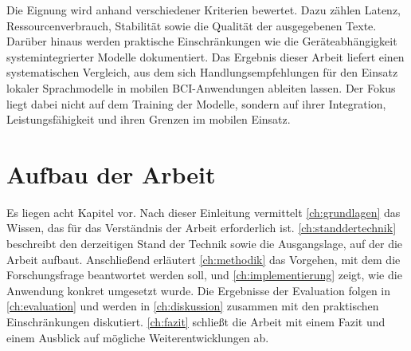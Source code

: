 \noindent Die Eignung wird anhand verschiedener Kriterien bewertet. Dazu zählen Latenz, Ressourcenverbrauch, Stabilität sowie die Qualität der ausgegebenen Texte. Darüber hinaus werden praktische Einschränkungen wie die Geräteabhängigkeit systemintegrierter Modelle dokumentiert. Das Ergebnis dieser Arbeit liefert einen systematischen Vergleich, aus dem sich Handlungsempfehlungen für den Einsatz lokaler Sprachmodelle in mobilen \ac{BCI}-Anwendungen ableiten lassen.
Der Fokus liegt dabei nicht auf dem Training der Modelle, sondern auf ihrer Integration, Leistungsfähigkeit und ihren Grenzen im mobilen Einsatz.

\section{Aufbau der Arbeit}
\label{sec:aufbau}
Es liegen acht Kapitel vor. Nach dieser Einleitung vermittelt \autoref{ch:grundlagen} das Wissen, das für das Verständnis der Arbeit erforderlich ist. \autoref{ch:standdertechnik} beschreibt den derzeitigen Stand der Technik sowie die Ausgangslage, auf der die Arbeit aufbaut. Anschließend erläutert \autoref{ch:methodik} das Vorgehen, mit dem die Forschungsfrage beantwortet werden soll, und \autoref{ch:implementierung} zeigt, wie die Anwendung konkret umgesetzt wurde. Die Ergebnisse der Evaluation folgen in \autoref{ch:evaluation} und werden in \autoref{ch:diskussion} zusammen mit den praktischen Einschränkungen diskutiert. \autoref{ch:fazit} schließt die Arbeit mit einem Fazit und einem Ausblick auf mögliche Weiterentwicklungen ab.